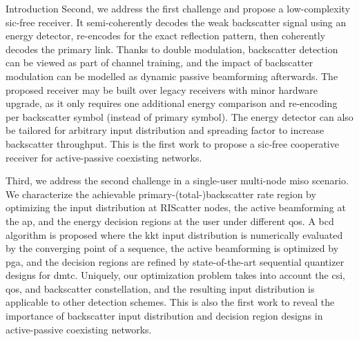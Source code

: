 \begin{section}{Introduction}
	Second, we address the first challenge and propose a low-complexity \gls{sic}-free receiver.
	It semi-coherently decodes the weak backscatter signal using an energy detector, re-encodes for the exact reflection pattern, then coherently decodes the primary link.
	Thanks to double modulation, backscatter detection can be viewed as part of channel training, and the impact of backscatter modulation can be modelled as dynamic passive beamforming afterwards.
	The proposed receiver may be built over legacy receivers with minor hardware upgrade, as it only requires one additional energy comparison and re-encoding per backscatter symbol (instead of primary symbol).
	The energy detector can also be tailored for arbitrary input distribution and spreading factor to increase backscatter throughput.
	This is the first work to propose a \gls{sic}-free cooperative receiver for active-passive coexisting networks.

	Third, we address the second challenge in a single-user multi-node \gls{miso} scenario.
	We characterize the achievable primary-(total-)backscatter rate region by optimizing the input distribution at RIScatter nodes, the active beamforming at the \gls{ap}, and the energy decision regions at the user under different \gls{qos}.
	A \gls{bcd} algorithm is proposed where the \gls{kkt} input distribution is numerically evaluated by the converging point of a sequence, the active beamforming is optimized by \gls{pga}, and the decision regions are refined by state-of-the-art sequential quantizer designs for \gls{dmtc}.
	Uniquely, our optimization problem takes into account the \gls{csi}, \gls{qos}, and backscatter constellation, and the resulting input distribution is applicable to other detection schemes.
	This is also the first work to reveal the importance of backscatter input distribution and decision region designs in active-passive coexisting networks.


\end{section}
